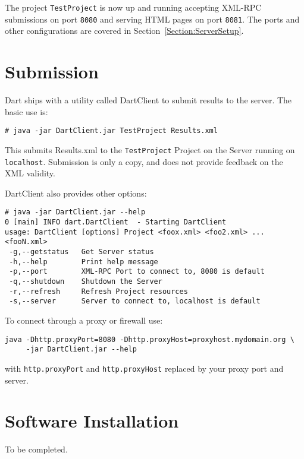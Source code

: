 \documentclass{InsightBook}
\begin{document}
The project \texttt{TestProject} is now up and running accepting
XML-RPC submissions on port \texttt{8080} and serving HTML pages on
port \texttt{8081}.  The ports and other configurations are covered in
Section~\ref{Section:ServerSetup}.

\section{Submission}
Dart ships with a utility called DartClient to submit results to the
server.  The basic use is:
\begin{verbatim}
# java -jar DartClient.jar TestProject Results.xml
\end{verbatim}

This submits Results.xml to the \texttt{TestProject} Project on the
Server running on \texttt{localhost}.  Submission is only a copy, and
does not provide feedback on the XML validity.

DartClient also provides other options:
\begin{verbatim}
# java -jar DartClient.jar --help
0 [main] INFO dart.DartClient  - Starting DartClient
usage: DartClient [options] Project <foox.xml> <foo2.xml> ... <fooN.xml>
 -g,--getstatus   Get Server status
 -h,--help        Print help message
 -p,--port        XML-RPC Port to connect to, 8080 is default
 -q,--shutdown    Shutdown the Server
 -r,--refresh     Refresh Project resources
 -s,--server      Server to connect to, localhost is default
\end{verbatim}

To connect through a proxy or firewall use:
\begin{verbatim}
java -Dhttp.proxyPort=8080 -Dhttp.proxyHost=proxyhost.mydomain.org \
     -jar DartClient.jar --help
\end{verbatim}
with \texttt{http.proxyPort} and \texttt{http.proxyHost} replaced by
your proxy port and server.

\section{Software Installation}
To be completed.
\end{document}
